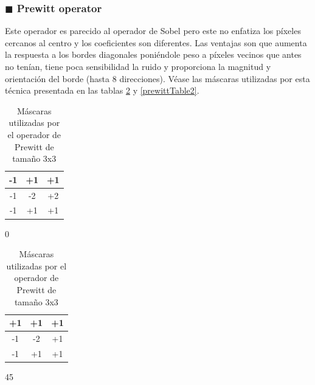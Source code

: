 \subsubsection{$\blacksquare$ \quad Prewitt operator}

Este operador es parecido al operador de Sobel pero este no enfatiza los p\'{i}xeles cercanos al centro y los coeficientes son diferentes. Las ventajas son que aumenta la respuesta a los bordes diagonales poni\'{e}ndole peso a p\'{i}xeles vecinos que antes no ten\'{i}an, tiene poca sensibilidad la ruido y proporciona la magnitud y orientaci\'{o}n del borde (hasta 8 direcciones). V\'{e}ase las m\'{a}scaras utilizadas por esta t\'{e}cnica presentada en las tablas \ref{prewittTable1} y \ref{prewittTable2}.
 \begin{table}[H]
 	\parbox{.45\linewidth}{
 		\centering
		\begin{tabular}{|c|c|c|}
			\hline
			-1 & +1 & +1 \\ \hline
			-1 & -2 & +2 \\ \hline
			-1 & +1 & +1 \\ \hline
		\end{tabular}
 		\caption*{0}
 	}
 	\parbox{.45\linewidth}{
 		\centering
			\begin{tabular}{|c|c|c|}
				\hline
				+1 & +1 & +1 \\ \hline
				-1 & -2 & +1 \\ \hline
				-1 & +1 & +1 \\ \hline
			\end{tabular}
 		\caption*{45}
 	}
	\captionsetup{justification=centering}
 	\caption{M\'{a}scaras utilizadas por el operador de Prewitt de tama\~{n}o 3x3}
	\label{prewittTable1}
 \end{table}

